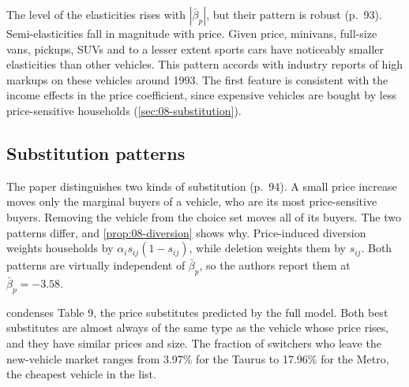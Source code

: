 The level of the elasticities rises with $|\bar\beta_p|$, but their pattern is robust (p.~93). Semi-elasticities
fall in magnitude with price. Given price, minivans, full-size vans, pickups, SUVs and to a lesser extent
sports cars have noticeably smaller elasticities than other vehicles. This pattern accords with industry reports
of high markups on these vehicles around 1993. The first feature is consistent with the income
effects in the price coefficient, since expensive vehicles are bought by less price-sensitive households
(\cref{sec:08-substitution}).

\subsection{Substitution patterns}\label{sec:08-blp04-substitution}

The paper distinguishes two kinds of substitution (p.~94). A small price increase moves only the marginal
buyers of a vehicle, who are its most price-sensitive buyers. Removing the vehicle from the choice set moves all
of its buyers. The two patterns differ, and \cref{prop:08-diversion} shows why. Price-induced diversion weights
households by $\alpha_i s_{ij}(1 - s_{ij})$, while deletion weights them by $s_{ij}$. Both patterns are
virtually independent of $\bar\beta_p$, so the authors report them at $\bar\beta_p = -3.58$.

 condenses Table 9, the price substitutes predicted by the full model. Both best
substitutes are almost always of the same type as the vehicle whose price rises, and they have similar prices
and size. The fraction of switchers who leave the new-vehicle market ranges from 3.97\% for the Taurus to
17.96\% for the Metro, the cheapest vehicle in the list.

